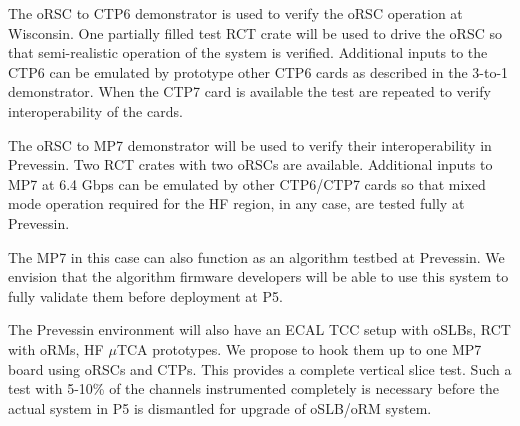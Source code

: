 The oRSC to CTP6 demonstrator is used to verify the oRSC operation at
Wisconsin.  One partially filled test RCT crate will be used to drive
the oRSC so that semi-realistic operation of the system is verified.
Additional inputs to the CTP6 can be emulated by prototype other CTP6
cards as described in the 3-to-1 demonstrator.  When the CTP7 card is
available the test are repeated to verify interoperability of the
cards.

The oRSC to MP7 demonstrator will be used to verify their
interoperability in Prevessin.  Two RCT crates with two oRSCs are
available.  Additional inputs to MP7 at 6.4 Gbps can be emulated by
other CTP6/CTP7 cards so that mixed mode operation required for
the HF region, in any case, are tested fully at Prevessin.

The MP7 in this case can also function as an algorithm testbed
at Prevessin.  We envision that the algorithm firmware developers
will be able to use this system to fully validate them before
deployment at P5.


The Prevessin environment will also have an ECAL TCC setup with
oSLBs, RCT with oRMs, HF $\mu$TCA prototypes.  We propose to 
hook them up to one MP7 board using oRSCs and CTPs.  This provides
a complete vertical slice test.  Such a test with 5-10\% of the
channels instrumented completely is necessary before the actual
system in P5 is dismantled for upgrade of oSLB/oRM system.


